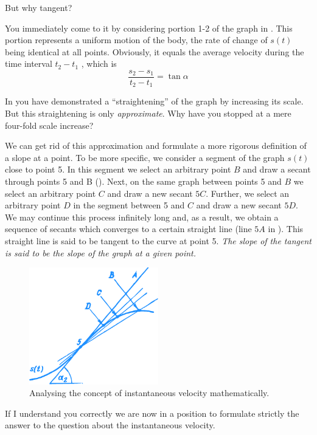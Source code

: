 {\rdr But why tangent?

\athr You immediately come to it by considering portion 1-2 of the graph in . This portion represents a uniform motion of the body, the rate of change of $s (t)$ being identical at all points. Obviously, it equals the
average velocity during the time interval $t_{2} -	t_{1}$ , which is 
\begin{equation*}%
\frac{s_{2}-s_{1}}{t_{2} - t_{1}} = \tan \alpha
\end{equation*}

\rdr In  you have demonstrated a ``straightening'' of the graph by increasing its scale. But this straightening is only \emph{approximate}. Why have you stopped at a mere four-fold scale increase?

\athr We can get rid of this approximation and formulate a more rigorous definition of a slope at a point. To be more specific, we consider a segment of the graph $s (t)$ close to point 5. In this segment we select an arbitrary point $B$ and draw a secant through points 5 and B (). Next, on the same graph between points 5 and $B$ we select an arbitrary point $C$ and draw a new secant $5C$. Further, we select an arbitrary point $D$ in the segment between 5
and $C$ and draw a new secant $5D$. We may continue this process infinitely long and, as a result, we obtain a sequence of secants which converges to a certain straight line (line $5A$ in ). This straight line is said to be tangent to the curve at point 5. \emph{The slope of the tangent is said to be the slope of the graph at a given point.}
\begin{figure}[!ht]%
\centering
\includegraphics[width=0.5\textwidth]{figures/fig-33.pdf}
\caption{Analysing the concept of instantaneous velocity mathematically.}
\label{fig-33}
\end{figure}

\rdr If I understand you correctly we are now in a position to formulate strictly the answer to the question about the instantaneous velocity.

}
